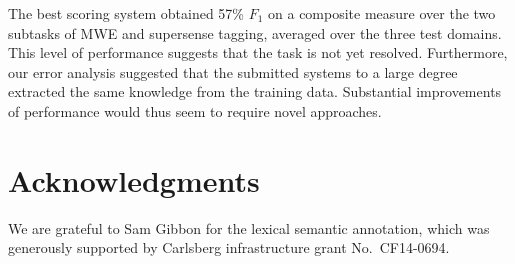 \documentclass[11pt,letterpaper]{article}
\begin{document}
The best scoring system obtained 57\% $F_1$ on a composite measure over the two subtasks of MWE and supersense tagging, 
averaged over the three test domains. This level of performance suggests that the task is not yet resolved. 
Furthermore, our error analysis suggested that the submitted systems to a large degree 
extracted the same knowledge from the training data. 
Substantial improvements of performance would thus seem to require novel approaches. 

\section*{Acknowledgments}

We are grateful to Sam Gibbon for the lexical semantic annotation,
which was generously supported by Carlsberg infrastructure grant No.~CF14-0694.
\end{document}
